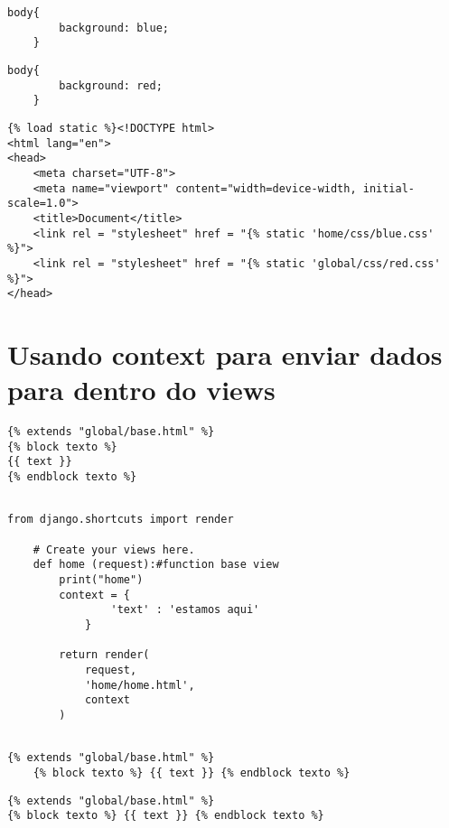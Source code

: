 \documentclass{article}
\begin{document}
\begin{lstlisting}[style=cssStyle, caption={home/css/blue.css}]
    body{
        background: blue;
    }
\end{lstlisting}

\begin{lstlisting}[style=cssStyle, caption={global/css/red.css}]
    body{
        background: red;
    }
\end{lstlisting}

\begin{lstlisting}[style=htmlStyle, caption={base/global/partials/head.html}]
    {% load static %}<!DOCTYPE html>
<html lang="en">
<head>
    <meta charset="UTF-8">
    <meta name="viewport" content="width=device-width, initial-scale=1.0">
    <title>Document</title>
    <link rel = "stylesheet" href = "{% static 'home/css/blue.css' %}">
    <link rel = "stylesheet" href = "{% static 'global/css/red.css' %}">
</head>
\end{lstlisting}

\section{Usando context para enviar dados para dentro do views}
\begin{lstlisting}[style=htmlStyle, caption={home/templates/home/home.html}]
{% extends "global/base.html" %}
{% block texto %} 
{{ text }}
{% endblock texto %}
   
\end{lstlisting}

\begin{lstlisting}[style=pythonStyle, caption={home/views.py}]
    from django.shortcuts import render

    # Create your views here.
    def home (request):#function base view
        print("home")
        context = {
                'text' : 'estamos aqui'
            }
    
        return render(
            request,
            'home/home.html',
            context
        )
    
\end{lstlisting}

\begin{lstlisting}[style=htmlStyle, caption={blog/templates/blog/example.html}]
    {% extends "global/base.html" %}
    {% block texto %} {{ text }} {% endblock texto %}
\end{lstlisting}

\begin{lstlisting}[style=htmlStyle, caption={blog/templates/blog/example.html}]
{% extends "global/base.html" %}
{% block texto %} {{ text }} {% endblock texto %}  
\end{lstlisting}
\end{document}
